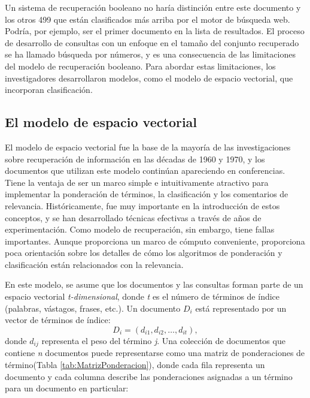 Un sistema de recuperación booleano no haría distinción entre este documento y los otros 499 que están clasificados más arriba por el motor de búsqueda web. Podría, por ejemplo, ser el primer documento en la lista de resultados.
El proceso de desarrollo de consultas con un enfoque en el tamaño del conjunto recuperado se ha llamado búsqueda por números, y es una consecuencia de las limitaciones del modelo de recuperación booleano. Para abordar estas limitaciones, los investigadores desarrollaron modelos, como el modelo de espacio vectorial, que incorporan clasificación.

\subsection{El modelo de espacio vectorial}

El modelo de espacio vectorial fue la base de la mayoría de las investigaciones sobre recuperación de información en las décadas de 1960 y 1970, y los documentos que utilizan este modelo continúan apareciendo en conferencias. Tiene la ventaja de ser un marco simple e intuitivamente atractivo para implementar la ponderación de términos, la clasificación y los comentarios de relevancia.
Históricamente, fue muy importante en la introducción de estos conceptos, y se han desarrollado técnicas efectivas a través de años de experimentación. Como modelo de recuperación, sin embargo, tiene fallas importantes. Aunque proporciona un marco de cómputo conveniente, proporciona poca orientación sobre los detalles de cómo los algoritmos de ponderación y clasificación están relacionados con la relevancia.

En este modelo, se asume que los documentos y las consultas forman parte de un espacio vectorial \textit{t-dimensional}, donde \textit{t} es el número de términos de índice (palabras, vástagos, frases, etc.). Un documento $ D_i $ está representado por un vector de términos de índice: $$D_i=(d_{i1},d_{i2},\dots ,d_{it}),$$
donde $ d_{ij} $ representa el peso del término \textit{j}. Una colección de documentos que contiene \textit{n} documentos puede representarse como una matriz de ponderaciones de término(Tabla \ref{tab:MatrizPonderacion}), donde cada fila representa un documento y cada columna describe las ponderaciones asignadas a un término para un documento en particular:

